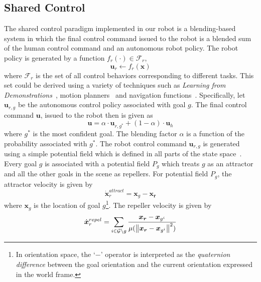 \subsection{Shared Control}\label{ssec:shared}
The shared control paradigm implemented in our robot is a blending-based system in  which the final control command issued to the robot is a blended sum of the human control command and an autonomous robot policy.
The robot policy is generated by a function $f_{r}(\cdot) \in \mathcal{F}_{r}$, 
\begin{equation*}
\boldsymbol{u}_r \leftarrow f_{r}(\boldsymbol{x})
\end{equation*}
where $\mathcal{F}_{r}$ is the set of all control behaviors corresponding to different tasks. This set could be derived using a variety of techniques such as \textit{Learning from Demonstrations}~\cite{argall2009survey, schaal1997learning, khansari2011learning, calinon2012statistical}, motion planners~\cite{hsu2002randomized,ratliff2009chomp} and navigation functions~\cite{rimon1992exact,tanner2003nonholonomic}. Specifically, let $\boldsymbol{u}_{r,g}$ be the autonomous control policy associated with goal $g$. The final control command $\boldsymbol{u}$, issued to the robot then is given as 
\begin{equation*}
\boldsymbol{u} = \alpha\cdot \boldsymbol{u}_{r,g^*} + (1 - \alpha)\cdot \boldsymbol{u}_h
\end{equation*}
where $g^*$ is the most confident goal. The blending factor $\alpha$ is a function of the probability associated with $g^*$.
The robot control command $\boldsymbol{u}_{r,g}$ is generated using a simple potential field which is defined in all parts of the state space~\cite{khatib1986real}. Every goal $g$ is associated with a potential field $P_g$ which treats $g$ as an attractor and all the other goals in the scene as repellers. For potential field $P_g$, the attractor velocity is given by
\begin{equation*}
\dot{\boldsymbol{x}}_r^{attract} = \boldsymbol{x}_{g} - \boldsymbol{x_r}
\end{equation*}
where $\boldsymbol{x}_{g}$ is the location of goal $g$\footnote{In orientation space, the `$-$' operator is interpreted as the \textit{quaternion difference} between the goal orientation and the current orientation expressed in the world frame.}. The repeller velocity is given by
\begin{equation*}
\dot{\boldsymbol{x}}_r^{repel} = \sum_{i \in \mathcal{G} \setminus g} \frac{\boldsymbol{x_r} - \boldsymbol{x}_{g^i}}{\mu(\left\lVert\boldsymbol{x_r} - \boldsymbol{x}_{g^i}\right\rVert^2)}
\end{equation*}
